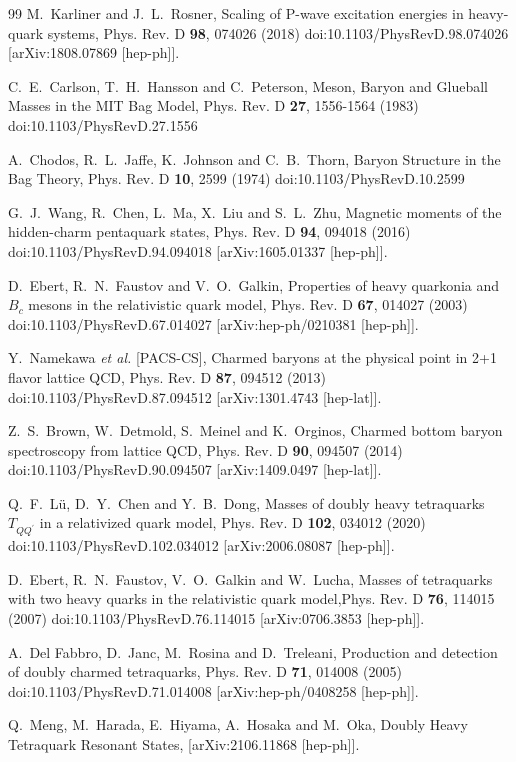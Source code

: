 \documentclass[prt,twocolumn,floatfix,nofootinbib]{revtex4}
\begin{document}
\begin{thebibliography}{99}
    M.~Karliner and J.~L.~Rosner, Scaling of P-wave excitation energies in heavy-quark systems, Phys. Rev. D \textbf{98}, 074026 (2018)
    doi:10.1103/PhysRevD.98.074026 [arXiv:1808.07869 [hep-ph]].

    C.~E.~Carlson, T.~H.~Hansson and C.~Peterson, Meson, Baryon and Glueball Masses in the MIT Bag Model, Phys. Rev. D \textbf{27}, 1556-1564 (1983)
    doi:10.1103/PhysRevD.27.1556

    A.~Chodos, R.~L.~Jaffe, K.~Johnson and C.~B.~Thorn, Baryon Structure in the Bag Theory, Phys. Rev. D \textbf{10}, 2599 (1974) doi:10.1103/PhysRevD.10.2599

    G.~J.~Wang, R.~Chen, L.~Ma, X.~Liu and S.~L.~Zhu, Magnetic moments of the hidden-charm pentaquark states, Phys. Rev. D \textbf{94}, 094018 (2016)
    doi:10.1103/PhysRevD.94.094018 [arXiv:1605.01337 [hep-ph]].

    D.~Ebert, R.~N.~Faustov and V.~O.~Galkin, Properties of heavy quarkonia and $B_c$ mesons in the relativistic quark model, Phys. Rev. D \textbf{67}, 014027 (2003)  doi:10.1103/PhysRevD.67.014027 [arXiv:hep-ph/0210381 [hep-ph]].

    Y.~Namekawa \textit{et al.} [PACS-CS], Charmed baryons at the physical point in 2+1 flavor lattice QCD, Phys. Rev. D \textbf{87}, 094512 (2013)
    doi:10.1103/PhysRevD.87.094512  [arXiv:1301.4743 [hep-lat]].

    Z.~S.~Brown, W.~Detmold, S.~Meinel and K.~Orginos, Charmed bottom baryon spectroscopy from lattice QCD, Phys. Rev. D \textbf{90}, 094507 (2014)
    doi:10.1103/PhysRevD.90.094507  [arXiv:1409.0497 [hep-lat]].

    Q.~F.~L\"u, D.~Y.~Chen and Y.~B.~Dong, Masses of doubly heavy tetraquarks $T_{QQ^\prime}$ in a relativized quark model, Phys. Rev. D \textbf{102}, 034012 (2020)  doi:10.1103/PhysRevD.102.034012 [arXiv:2006.08087 [hep-ph]].

    D.~Ebert, R.~N.~Faustov, V.~O.~Galkin and W.~Lucha, Masses of tetraquarks with two heavy quarks in the relativistic quark model,Phys. Rev. D \textbf{76}, 114015 (2007)  doi:10.1103/PhysRevD.76.114015  [arXiv:0706.3853 [hep-ph]].

    A.~Del Fabbro, D.~Janc, M.~Rosina and D.~Treleani, Production and detection of doubly charmed tetraquarks, Phys. Rev. D \textbf{71}, 014008 (2005)
    doi:10.1103/PhysRevD.71.014008 [arXiv:hep-ph/0408258 [hep-ph]].

    Q.~Meng, M.~Harada, E.~Hiyama, A.~Hosaka and M.~Oka, Doubly Heavy Tetraquark Resonant States, [arXiv:2106.11868 [hep-ph]].

\end{thebibliography}
\end{document}
